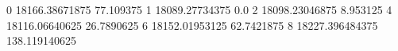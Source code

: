 0 18166.38671875 77.109375
1 18089.27734375 0.0
2 18098.23046875 8.953125
4 18116.06640625 26.7890625
6 18152.01953125 62.7421875
8 18227.396484375 138.119140625
